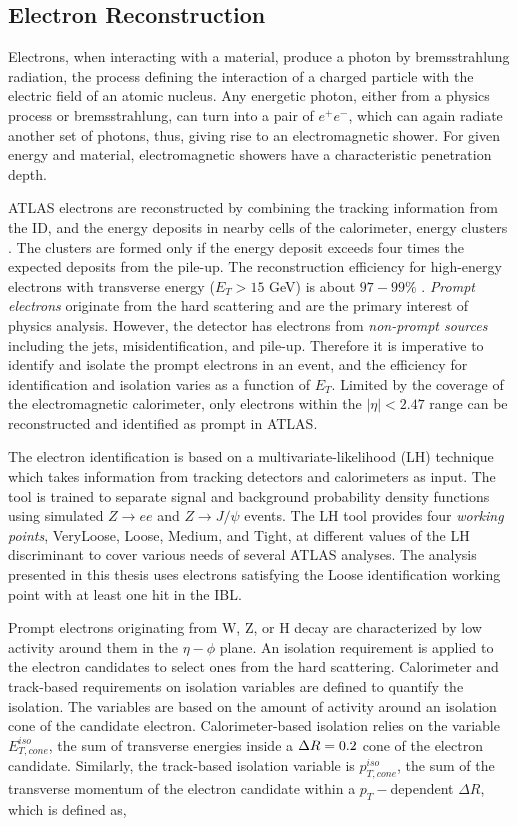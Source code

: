\subsection{Electron Reconstruction}
\label{subsec:ParticleRecon_Elec}
Electrons, when interacting with a material, produce a photon by bremsstrahlung radiation, the process defining the interaction of a charged particle with the electric field of an atomic nucleus. Any energetic photon, either from a physics process or bremsstrahlung, can turn into a pair of $e^{+}e^{-}$, which can again radiate another set of photons, thus, giving rise to an electromagnetic shower. For given energy and material, electromagnetic showers have a characteristic penetration depth.

ATLAS electrons are reconstructed by combining the tracking information from the ID, and the energy deposits in nearby cells of the calorimeter,  energy clusters \cite{ElectronReco}. The clusters are formed only if the energy deposit exceeds four times the expected deposits from the pile-up. The reconstruction efficiency for high-energy electrons with transverse energy ($E_{T}>15$ GeV) is about $97-99\%$ \cite{ElectronReco}. \textit{Prompt electrons} originate from the hard scattering and are the primary interest of physics analysis. However, the detector has electrons from \textit{non-prompt sources} including the jets, misidentification, and pile-up. Therefore it is imperative to identify and isolate the prompt electrons in an event, and the efficiency for identification and isolation varies as a function of $E_{T}$. Limited by the coverage of the electromagnetic calorimeter, only electrons within the $|\eta| <2.47$ range can be reconstructed and identified as prompt in ATLAS.

The electron identification is based on a multivariate-likelihood (LH) technique which takes information from tracking detectors and calorimeters as input. The tool is trained to separate signal and background probability density functions using simulated $Z \rightarrow ee$ and $Z \rightarrow J / \psi$ events. The LH tool provides four \textit{working points}, VeryLoose, Loose, Medium, and Tight, at different values of the LH discriminant to cover various needs of several ATLAS analyses. The analysis presented in this thesis uses electrons satisfying the Loose identification working point with at least one hit in the IBL. 

Prompt electrons originating from W, Z, or H decay are characterized by low activity around them in the $\eta-\phi$ plane. An isolation requirement is applied to the electron candidates to select ones from the hard scattering. Calorimeter and track-based requirements on isolation variables are defined to quantify the isolation. The variables are based on the amount of activity around an isolation cone of the candidate electron. Calorimeter-based isolation relies on the variable $E_{T,cone}^{iso}$, the sum of transverse energies inside a $\Delta R=0.2$ cone of the electron candidate. Similarly, the track-based isolation variable is $p_{T,cone}^{iso}$, the sum of the transverse momentum of the electron candidate within a $p_{T}-$dependent $\Delta R$, which is defined as, 

